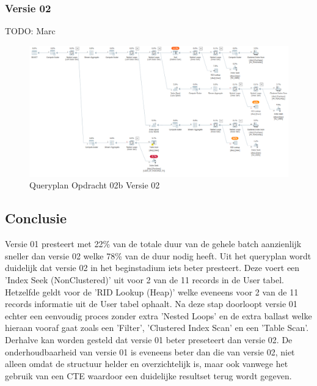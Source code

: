\subsubsection{Versie 02}
TODO: Marc

\begin{figure}[H]
    \centering
    \includegraphics[width=1\textwidth]{image/marc/opdracht-02b.PNG}
    \caption{Queryplan Opdracht 02b Versie 02}
\end{figure}

\subsection{Conclusie}
Versie 01 presteert met 22\% van de totale duur van de gehele batch aanzienlijk sneller dan versie 02 welke 78\% van de duur nodig heeft.
Uit het queryplan wordt duidelijk dat versie 02 in het beginstadium iets beter presteert. Deze voert een 'Index Seek (NonClustered)' uit
voor 2 van de 11 records in de User tabel. Hetzelfde geldt voor de 'RID Lookup (Heap)' welke eveneens voor 2 van de 11 records informatie
uit de User tabel ophaalt. Na deze stap doorloopt versie 01 echter een eenvoudig proces zonder extra 'Nested Loops' en de extra ballast
welke hieraan vooraf gaat zoals een 'Filter', 'Clustered Index Scan' en een 'Table Scan'. Derhalve kan worden gesteld dat versie 01
beter preseteert dan versie 02. De onderhoudbaarheid van versie 01 is eveneens beter dan die van versie 02, niet alleen omdat de structuur
helder en overzichtelijk is, maar ook vanwege het gebruik van een CTE waardoor een duidelijke resultset terug wordt gegeven.